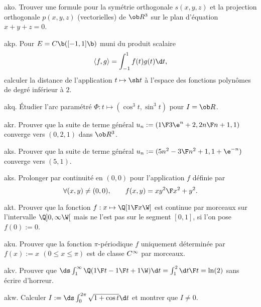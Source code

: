 
\exo [Origin=\Lakedaemon,Level=2,Fight=1,Learn=1,Type=\TravauxDirigés,Field=\Orthonormalisation] ako. 
Trouver une formule pour la symétrie orthogonale $s(x,y,z)$ et la projection orthogonale $p(x,y,z)$ (vectorielles) de $\ob R^3$ sur le plan d'équation $x+y+z=0$. 

\exo [Origin=\Lakedaemon,Level=2,Fight=1,Learn=1,Type=\Exercices,Field=\Orthonormalisation] akp. 
Pour $E=\sc C\b([-1,1]\b)$ muni du produit scalaire 
$$
\langle f,g\rangle=\int_{-1}^1f(t)g(t)\d t,
$$ 
calculer la distance de l'application $t\mapsto \sh t$ à l'espace des fonctions polynômes de degré inférieur à $2$. 

\exo [Origin=\Lakedaemon,Level=2,Fight=1,Learn=1,Type=\Cours,Field=\Courbes] akq. 
Étudier l'arc paramétré $\Phi:t\mapsto(\cos^3t,\sin^3t)$ pour $I=\ob R$. 

\exo [Origin=\Lakedaemon,Level=1,Fight=0,Learn=0,Type=\Cours,Field=\Suites] akr. 
Prouver que la suite de terme général $u_n:=({1\F 3\e^n+2}, {2n\F n+1}, 1)$ converge vers $(0,2,1)$ dans $\ob R^3$. 

\exo [Origin=\Lakedaemon,Level=1,Fight=0,Learn=0,Type=\Cours,Field=\Suites] aks. 
Prouver que la suite de terme général $u_n:=({5n^2-3\F n^2+1},1+\e^{-n})$ converge vers $(5,1)$. 

\exo [Origin=\Lakedaemon,Level=2,Fight=1,Learn=1,Type=\Exercices,Field=\FonctionsDePlusieursVariables] aks. 
Prolonger par continuité en $(0,0)$ pour l'application $f$ définie par 
$$
\forall (x,y)\neq(0,0), \qquad f(x,y)={xy^2\F x^2+y^2}. 
$$

\exo [Origin=\Lakedaemon,Level=2,Fight=0,Learn=0,Type=\Cours,Field=\Fonctions] akt. 
Prouver que la fonction $f:x\mapsto \Q[{1\F x}\W]$ est continue par morceaux sur l'intervalle $\Q]0, \infty\W[$ mais ne l'est pas sur le segment $[0, 1]$, si l'on pose $f(0):=0$.  

\exo [Origin=\Lakedaemon,Level=2,Fight=0,Learn=0,Type=\Cours,Field=\Fonctions] aku. 
Prouver que la fonction $\pi$-périodique $f$ uniquement déterminée par $f(x):=x\ \,(0\le x\le \pi)$ est de classe $\sc C^\infty$ par morceaux.  

\exo [Origin=\Lakedaemon,Level=2,Fight=1,Learn=1,Type=\Exercices,Field=\IntégralesGénéralisées] akv. 
Prouver que $\ds \int_1^\infty\Q({1\F t}-{1\F t+1}\W)\d t=\int_1^2{\d t\F t}=\ln(2)$ sans écrire d'horreur. 

\exo [Origin=\Lakedaemon,Level=2,Fight=1,Learn=1,Type=\Exercices,Field=\IntégralesGénéralisées] akw. 
Calculer $I:=\ds\int_0^{2\pi}\sqrt{1+\cos t}\d t$ et montrer que $I\neq 0$. 

